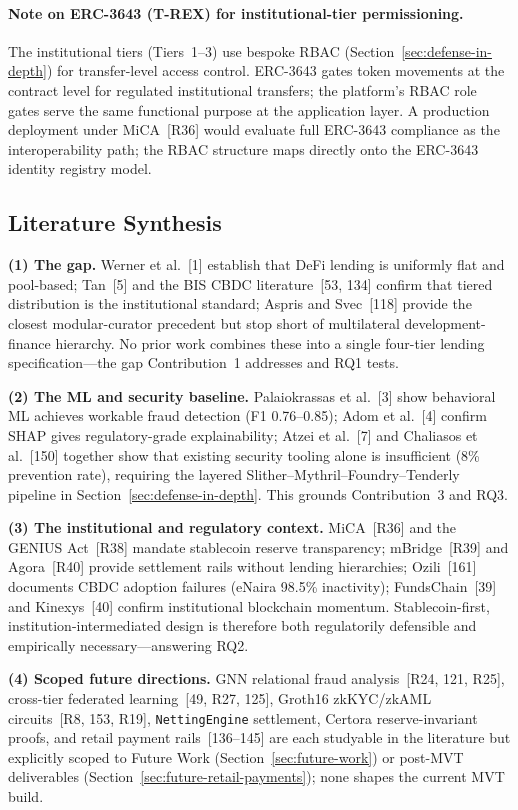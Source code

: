 \documentclass[12pt,a4paper]{report}
\begin{document}
\paragraph{Note on ERC-3643 (T-REX) for institutional-tier permissioning.}
The institutional tiers (Tiers~1--3) use bespoke RBAC (Section~\ref{sec:defense-in-depth}) for transfer-level access control. ERC-3643 gates token movements at the contract level for regulated institutional transfers; the platform's RBAC role gates serve the same functional purpose at the application layer. A production deployment under MiCA~[R36] would evaluate full ERC-3643 compliance as the interoperability path; the RBAC structure maps directly onto the ERC-3643 identity registry model.

\subsection{Literature Synthesis}

\textbf{(1) The gap.} Werner et al.~[1] establish that DeFi lending is uniformly flat and pool-based; Tan~[5] and the BIS CBDC literature~[53, 134] confirm that tiered distribution is the institutional standard; Aspris and Svec~[118] provide the closest modular-curator precedent but stop short of multilateral development-finance hierarchy. No prior work combines these into a single four-tier lending specification---the gap Contribution~1 addresses and RQ1 tests.

\textbf{(2) The ML and security baseline.} Palaiokrassas et al.~[3] show behavioral ML achieves workable fraud detection (F1 0.76--0.85); Adom et al.~[4] confirm SHAP gives regulatory-grade explainability; Atzei et al.~[7] and Chaliasos et al.~[150] together show that existing security tooling alone is insufficient (8\% prevention rate), requiring the layered Slither--Mythril--Foundry--Tenderly pipeline in Section~\ref{sec:defense-in-depth}. This grounds Contribution~3 and RQ3.

\textbf{(3) The institutional and regulatory context.} MiCA~[R36] and the GENIUS Act~[R38] mandate stablecoin reserve transparency; mBridge~[R39] and Agora~[R40] provide settlement rails without lending hierarchies; Ozili~[161] documents CBDC adoption failures (eNaira 98.5\% inactivity); FundsChain~[39] and Kinexys~[40] confirm institutional blockchain momentum. Stablecoin-first, institution-intermediated design is therefore both regulatorily defensible and empirically necessary---answering RQ2.

\textbf{(4) Scoped future directions.} GNN relational fraud analysis~[R24, 121, R25], cross-tier federated learning~[49, R27, 125], Groth16 zkKYC/zkAML circuits~[R8, 153, R19], \texttt{NettingEngine} settlement, Certora reserve-invariant proofs, and retail payment rails~[136--145] are each studyable in the literature but explicitly scoped to Future Work (Section~\ref{sec:future-work}) or post-MVT deliverables (Section~\ref{sec:future-retail-payments}); none shapes the current MVT build.
\end{document}
